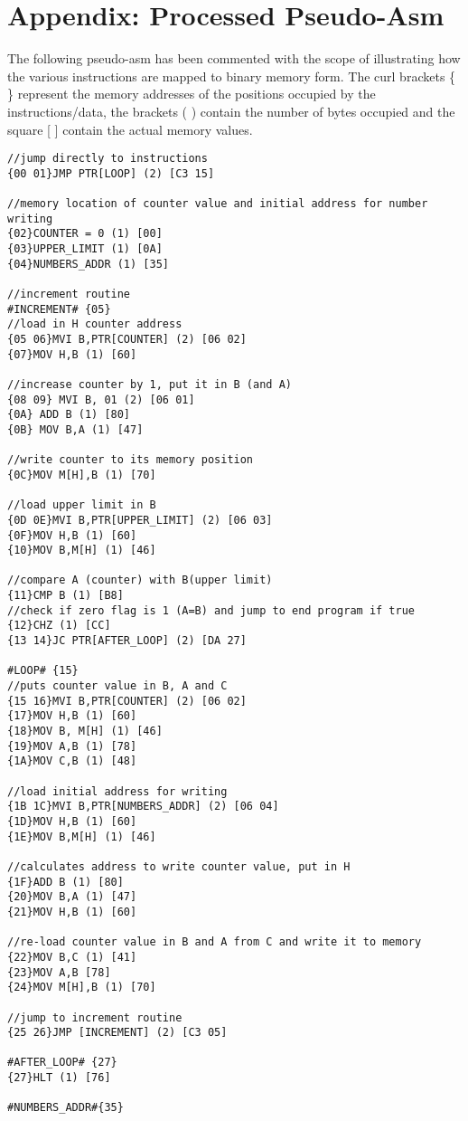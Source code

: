 \section{Appendix: Processed Pseudo-Asm} \label{sec:appendix}
The following pseudo-asm has been commented with the scope of illustrating how the various instructions are mapped to binary memory form.
The curl brackets \{ \} represent the memory addresses of the positions occupied by the
instructions/data, the brackets ( ) contain the number of bytes occupied and the square [ ] contain the actual memory values.
\begin{verbatim}
//jump directly to instructions
{00 01}JMP PTR[LOOP] (2) [C3 15]

//memory location of counter value and initial address for number writing
{02}COUNTER = 0 (1) [00]
{03}UPPER_LIMIT (1) [0A]
{04}NUMBERS_ADDR (1) [35]

//increment routine
#INCREMENT# {05}
//load in H counter address
{05 06}MVI B,PTR[COUNTER] (2) [06 02]
{07}MOV H,B (1) [60]

//increase counter by 1, put it in B (and A)
{08 09} MVI B, 01 (2) [06 01]
{0A} ADD B (1) [80]
{0B} MOV B,A (1) [47]

//write counter to its memory position
{0C}MOV M[H],B (1) [70]

//load upper limit in B
{0D 0E}MVI B,PTR[UPPER_LIMIT] (2) [06 03]
{0F}MOV H,B (1) [60]
{10}MOV B,M[H] (1) [46]

//compare A (counter) with B(upper limit)
{11}CMP B (1) [B8]
//check if zero flag is 1 (A=B) and jump to end program if true
{12}CHZ (1) [CC]
{13 14}JC PTR[AFTER_LOOP] (2) [DA 27]

#LOOP# {15}
//puts counter value in B, A and C
{15 16}MVI B,PTR[COUNTER] (2) [06 02]
{17}MOV H,B (1) [60]
{18}MOV B, M[H] (1) [46]
{19}MOV A,B (1) [78]
{1A}MOV C,B (1) [48]

//load initial address for writing
{1B 1C}MVI B,PTR[NUMBERS_ADDR] (2) [06 04]
{1D}MOV H,B (1) [60]
{1E}MOV B,M[H] (1) [46]

//calculates address to write counter value, put in H
{1F}ADD B (1) [80]
{20}MOV B,A (1) [47]
{21}MOV H,B (1) [60]

//re-load counter value in B and A from C and write it to memory
{22}MOV B,C (1) [41]
{23}MOV A,B [78]
{24}MOV M[H],B (1) [70]

//jump to increment routine
{25 26}JMP [INCREMENT] (2) [C3 05]

#AFTER_LOOP# {27}
{27}HLT (1) [76]

#NUMBERS_ADDR#{35}

\end{verbatim}